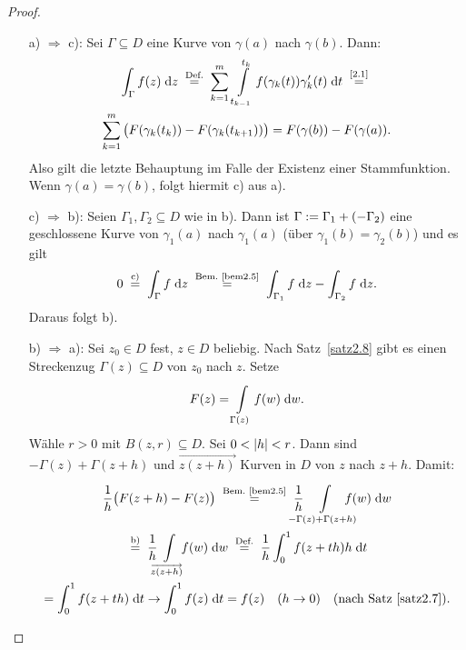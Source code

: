 \documentclass[a4paper,twoside,DIV15,BCOR12mm]{scrbook}
\begin{document}
\begin{proof}
  \begin{enumerate}
  \item[a)]$\!\Rightarrow$ c): Sei $\Gamma\subseteq D$ eine Kurve von $\gamma(a)$ nach $\gamma(b)$. Dann:
    \begin{multline*}
      \integral{\Gamma}{}{f(z)}{z} \nach{=}{Def.} \sum_{k=1}^{m}{\,\Integral{t_{k-1}}{t_k}{f(\gamma_k(t))\gamma_k^\prime(t)}{t}}
      \nach{=}{\eqref{2.1}} \\ \sum_{k=1}^{m}{\bigl(F(\gamma_k(t_k))-F(\gamma_k(t_{k+1}))\bigr)} = F(\gamma(b)) - F(\gamma(a)).
    \end{multline*}
    Also gilt die letzte Behauptung im Falle der Existenz einer Stammfunktion. Wenn $\gamma(a)=\gamma(b)$, folgt hiermit c)
    aus a).
  \item[c)]$\!\Rightarrow$ b): Seien $\Gamma_1, \Gamma_2 \subseteq D$ wie in b). Dann ist $\Gamma:=\Gamma_1+(-\Gamma_2)$ eine
    geschlossene Kurve von $\gamma_1(a)$ nach $\gamma_1(a)$ (über $\gamma_1(b)=\gamma_2(b)$) und es gilt
    \[ 0 \nach{=}{c)} \integral{\Gamma}{}{f}{z} \nach{=}{Bem.~\ref{bem2.5}} \integral{\Gamma_1}{}{f}{z} -
    \integral{\Gamma_2}{}{f}{z}.\]
    Daraus folgt b).
  \item[b)]$\!\Rightarrow$ a): Sei $z_0\in D$ fest, $z\in D$ beliebig. Nach Satz~\ref{satz2.8} gibt es einen Streckenzug
    $\Gamma(z)\subseteq D$ von $z_0$ nach $z$. Setze \[F(z) = \int\limits_{\Gamma(z)}^{}{f(w)}\;\mathrm{d}w.\] Wähle $r>0$ mit
    $B(z,r)\subseteq D$. Sei $0<\left\lvert h\right\lvert<r$. Dann sind $-\Gamma(z)+\Gamma(z+h)$ und $\overrightarrow{z(z+h)}$ Kurven in $D$ von
    $z$ nach $z+h$. Damit: %
    \begin{multline*}
      \frac1h \bigl(F(z+h)-F(z)\bigr) \nach{=}{Bem.~\ref{bem2.5}} \frac1h\!\!\!\!\!\!\!
      \Integral{-\Gamma(z)+\Gamma(z+h)}{}{\!\!\!\!\!\!\!\!f(w)}{w}
      \\ \nach{=}{b)} \frac1h\!\!\! \Integral{\overrightarrow{z(z+h)}}{}{\!\!\!f(w)}{w} \nach{=}{Def.} \frac1h
      \integral{0}{1}{f(z+th)h}{t} 
      \\ = \integral{0}{1}{f(z+th)}{t} \to \integral{0}{1}{f(z)}{t} = f(z) \quad (h\to0) \quad \text{(nach
        Satz~\ref{satz2.7}).} \qedhere
    \end{multline*}
  \end{enumerate}
\end{proof}
\end{document}
